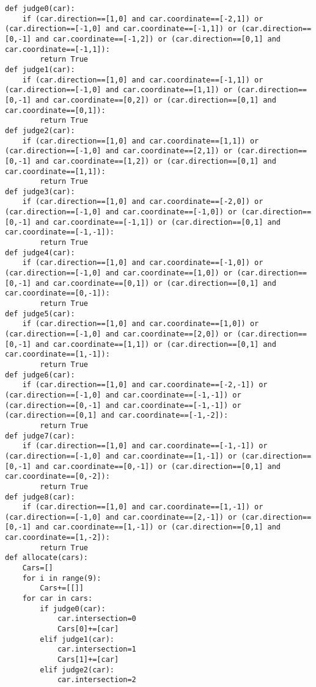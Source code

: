 \documentclass[a4paper,12pt]{article}
\numberwithin{equation}{section}
\begin{document}
\begin{appendix}
\begin{lstlisting}
def judge0(car):
    if (car.direction==[1,0] and car.coordinate==[-2,1]) or (car.direction==[-1,0] and car.coordinate==[-1,1]) or (car.direction==[0,-1] and car.coordinate==[-1,2]) or (car.direction==[0,1] and car.coordinate==[-1,1]):
        return True
def judge1(car):
    if (car.direction==[1,0] and car.coordinate==[-1,1]) or (car.direction==[-1,0] and car.coordinate==[1,1]) or (car.direction==[0,-1] and car.coordinate==[0,2]) or (car.direction==[0,1] and car.coordinate==[0,1]):
        return True
def judge2(car):
    if (car.direction==[1,0] and car.coordinate==[1,1]) or (car.direction==[-1,0] and car.coordinate==[2,1]) or (car.direction==[0,-1] and car.coordinate==[1,2]) or (car.direction==[0,1] and car.coordinate==[1,1]):
        return True
def judge3(car):
    if (car.direction==[1,0] and car.coordinate==[-2,0]) or (car.direction==[-1,0] and car.coordinate==[-1,0]) or (car.direction==[0,-1] and car.coordinate==[-1,1]) or (car.direction==[0,1] and car.coordinate==[-1,-1]):
        return True
def judge4(car):
    if (car.direction==[1,0] and car.coordinate==[-1,0]) or (car.direction==[-1,0] and car.coordinate==[1,0]) or (car.direction==[0,-1] and car.coordinate==[0,1]) or (car.direction==[0,1] and car.coordinate==[0,-1]):
        return True
def judge5(car):
    if (car.direction==[1,0] and car.coordinate==[1,0]) or (car.direction==[-1,0] and car.coordinate==[2,0]) or (car.direction==[0,-1] and car.coordinate==[1,1]) or (car.direction==[0,1] and car.coordinate==[1,-1]):
        return True
def judge6(car):
    if (car.direction==[1,0] and car.coordinate==[-2,-1]) or (car.direction==[-1,0] and car.coordinate==[-1,-1]) or (car.direction==[0,-1] and car.coordinate==[-1,-1]) or (car.direction==[0,1] and car.coordinate==[-1,-2]):
        return True
def judge7(car):
    if (car.direction==[1,0] and car.coordinate==[-1,-1]) or (car.direction==[-1,0] and car.coordinate==[1,-1]) or (car.direction==[0,-1] and car.coordinate==[0,-1]) or (car.direction==[0,1] and car.coordinate==[0,-2]):
        return True
def judge8(car):
    if (car.direction==[1,0] and car.coordinate==[1,-1]) or (car.direction==[-1,0] and car.coordinate==[2,-1]) or (car.direction==[0,-1] and car.coordinate==[1,-1]) or (car.direction==[0,1] and car.coordinate==[1,-2]):
        return True
def allocate(cars):
    Cars=[]
    for i in range(9):
        Cars+=[[]]
    for car in cars:
        if judge0(car):
            car.intersection=0
            Cars[0]+=[car]
        elif judge1(car):
            car.intersection=1
            Cars[1]+=[car]
        elif judge2(car):
            car.intersection=2

\end{lstlisting}
\end{appendix}
\end{document}
